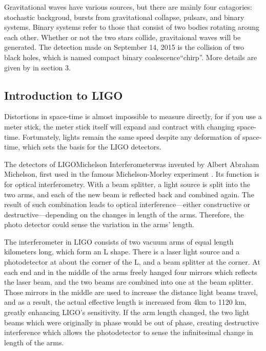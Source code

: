 \documentclass[aps,prd,preprint]{revtex4}
\begin{document}
\par Gravitational waves have various sources, but there are mainly four catagories: stochastic backgroud, bursts from gravitational collapse, pulsars, and binary systems. Binary systems refer to those that consist of two bodies rotating aroung each other. Whether or not the two stars collide, gravitaional waves will be generated. The detection made on September 14, 2015 is the collision of two black holes, which is named compact binary coalescence\textemdash \enquote{chirp}. \cite{O1} More details are given by \cite{SBackground} in section 3.

\subsection{Introduction to LIGO \label{sec:LIGO}}
Distortions in space-time is almost impossible to measure directly, for if you use a meter stick, the meter stick itself will expand and contract with changing space-time. Fortunately, lights remain the same speed despite any deformation of space-time, which sets the basis for the LIGO detectors. \cite{CaltechLIGO}
\par The detectors of LIGO\textemdash Michelson Interferometer\textemdash was invented by Albert Abraham Michelson, first used in the famous Michelson-Morley experiment \cite{Michelson-Morley}. Its function is for optical interferometry. With a beam splitter, a light source is split into the two arms, and each of the new beam is reflected back and combined again. The result of such combination leads to optical interference—either constructive or destructive—depending on the changes in length of the arms. Therefore, the photo detector could sense the variation in the arms’ length. \cite{CaltechLIGO}
\par The interferometer in LIGO consists of two vacuum arms of equal length kilometers long, which form an L shape. There is a laser light source and a photodetector at about the corner of the L, and a beam splitter at the corner. At each end and in the middle of the arms freely hanged four mirrors which reflects the laser beam, and the two beams are combined into one at the beam splitter. Those mirrors in the middle are used to increase the distance light beams travel, and as a result, the actual effective length is increased from 4km to 1120 km, greatly enhancing LIGO's sensitivity. If the arm length changed, the two light beams which were originally in phase would be out of phase, creating destructive interference which allows the photodetector to sense the infinitesimal change in length of the arms. \cite{CaltechLIGO, MitLIGO}
\end{document}
